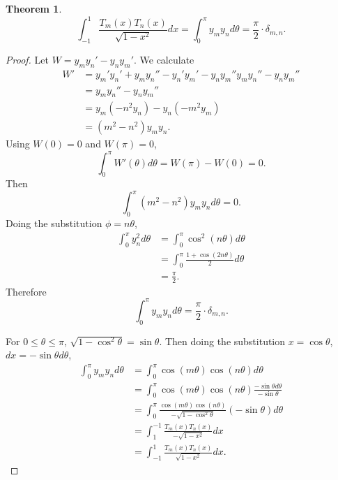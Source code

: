 \documentclass{article}
\theoremstyle{definition}
\newtheorem{theorem}{Theorem}
\theoremstyle{definition}
\begin{document}
\begin{theorem}
\[
\int_{-1}^1 \frac{T_m(x)T_n(x)}{\sqrt{1-x^2}} dx=
\int_0^\pi y_my_nd\theta = \frac{\pi}{2} \cdot \delta_{m,n}.
\]
\end{theorem}
\begin{proof}
Let $W=y_my_n'-y_ny_m'$. 
We calculate
\begin{align*}
W'&=y_m'y_n'+y_my_n''-y_n'y_m'-y_ny_m''
y_my_n''-y_ny_m''\\
&=y_my_n''-y_ny_m''\\
&=y_m(-n^2y_n) - y_n(-m^2y_m)\\
&=(m^2-n^2)y_my_n.
\end{align*}
Using $W(0)=0$ and $W(\pi)=0$,
\[
\int_0^\pi W'(\theta) d\theta = W(\pi)-W(0) = 0.
\]
Then
\[
\int_0^\pi (m^2-n^2)y_my_n d\theta = 0.
\]
Doing the substitution $\phi=n\theta$,
\begin{align*}
\int_0^\pi y_n^2 d\theta &= \int_0^\pi \cos^2(n\theta) d\theta\\
&=\int_0^\pi \frac{1+\cos(2n\theta)}{2} d\theta\\
&=\frac{\pi}{2}.
\end{align*}
Therefore
\[
\int_0^\pi y_my_nd\theta = \frac{\pi}{2} \cdot \delta_{m,n}.
\]

For $0 \leq \theta \leq \pi$, 
$\sqrt{1-\cos^2 \theta}=\sin \theta$. Then
doing the substitution $x=\cos \theta$, $dx=-\sin \theta d\theta$,
\begin{align*}
\int_0^\pi y_my_nd\theta&=\int_0^\pi \cos(m\theta) \cos(n\theta) d\theta\\
&=\int_0^\pi \cos(m\theta) \cos(n\theta) \frac{-\sin \theta d\theta}{-\sin \theta}\\
&=\int_0^\pi \frac{\cos(m\theta) \cos(n\theta)}{-\sqrt{1-\cos^2\theta}} (-\sin \theta) d\theta\\
&=\int_1^{-1} \frac{T_m(x)T_n(x)}{-\sqrt{1-x^2}} dx\\
&=\int_{-1}^1 \frac{T_m(x)T_n(x)}{\sqrt{1-x^2}} dx.
\end{align*}
\end{proof}
\end{document}

